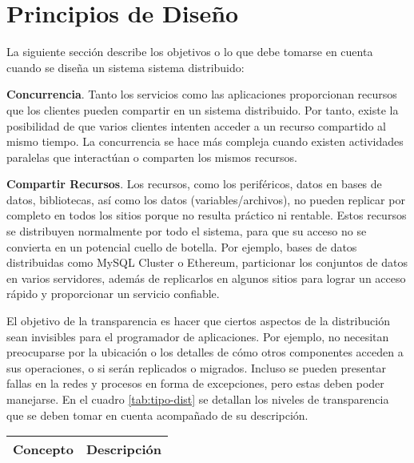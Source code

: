 \section{Principios de Dise\~no }
\label{sec:principio-SD}

La siguiente secci\'on describe los objetivos  o lo  que debe tomarse en cuenta cuando se  dise\~na un sistema sistema distribuido: \cite{Coulouris2011, Verissimo2012, Limoncelli2014, Steen2017, Deka2017, Czaja2018}

\begin{description} 
	
	\item {\textbf{Concurrencia}.}  Tanto los servicios como las aplicaciones proporcionan recursos que los clientes pueden compartir en un sistema distribuido. Por tanto, existe la posibilidad de que varios clientes intenten acceder a un recurso compartido al mismo tiempo. La concurrencia se hace más compleja cuando existen  actividades paralelas que interactúan o comparten los mismos recursos. 
	
	\item {\textbf{Compartir Recursos}.}  Los \gls{recursos}, como los  periféricos,  datos en bases de datos,  bibliotecas, así como los datos (variables/archivos),  no pueden replicar por completo en todos los sitios porque no resulta pr\'actico ni rentable. Estos recursos se distribuyen normalmente por todo el sistema, para que su acceso no se convierta en un potencial cuello de botella.
	Por ejemplo, bases de datos distribuidas como MySQL Cluster o Ethereum, particionar los conjuntos de datos en varios servidores, además de replicarlos en algunos sitios para lograr un acceso rápido y proporcionar un servicio confiable. 

	\item[{\textbf{Transparencia}.}]     El objetivo de la \gls{transparencia} es hacer que ciertos aspectos de la distribución sean invisibles para el programador de aplicaciones. Por ejemplo, no necesitan preocuparse por la ubicación o los detalles de cómo otros componentes acceden a sus operaciones, o si serán replicados o migrados. Incluso se pueden presentar fallas en la redes y procesos  en forma de excepciones, pero estas deben poder manejarse.  En el cuadro \ref{tab:tipo-dist} se detallan los niveles de transparencia que se deben tomar en cuenta acompañado de su descripción. 
	
	\begin{table} 
		\begin{center}
			\footnotesize		    
				\begin{tabular}{p{}p{}}
					\toprule
					Concepto &  Descripci\'on \\
					\midrule
					

\end{tabular}
\end{center}
\end{table}
\end{description}
